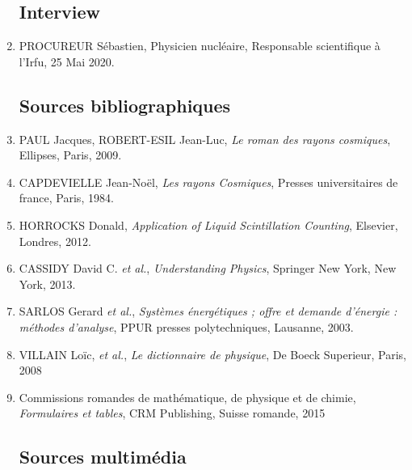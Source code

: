 \documentclass[a4paper, 12pt]{article}
\begin{document}
\begin{spacing}{1.5}
\begin{enumerate}
\subsection{Interview}

  \item PROCUREUR Sébastien, Physicien nucléaire, Responsable scientifique à l'Irfu, 25 Mai 2020.


\subsection{Sources bibliographiques}


  \item PAUL Jacques, ROBERT-ESIL Jean-Luc, \emph{Le roman des rayons cosmiques}, Ellipses, Paris, 2009.
  \item CAPDEVIELLE Jean-Noël, \emph{Les rayons Cosmiques}, Presses universitaires de france, Paris, 1984.
  \item HORROCKS Donald, \emph{Application of Liquid Scintillation Counting}, Elsevier, Londres, 2012.
  \item CASSIDY  David C. \emph{et al.}, \emph{Understanding Physics}, Springer New York, New York, 2013.
  \item SARLOS Gerard \emph{et al.}, \emph{Systèmes énergétiques ; offre et demande d'énergie : méthodes d'analyse}, PPUR presses polytechniques, Lausanne, 2003.
  \item VILLAIN Loïc, \emph{et al.}, \emph{Le dictionnaire de physique}, De Boeck Superieur, Paris, 2008
  \item Commissions romandes de mathématique, de physique et de chimie, \emph{Formulaires et tables}, CRM Publishing, Suisse romande, 2015

\subsection{Sources multimédia}


\end{enumerate}
\end{spacing}
\end{document}

